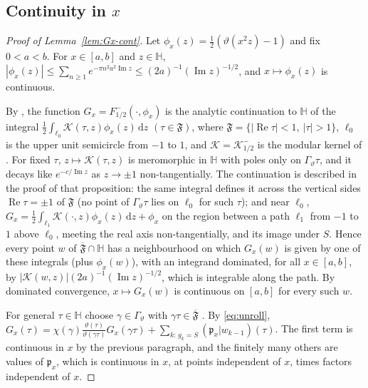 \documentclass[11pt]{amsart}
\newcommand{\dd}{\,\mathrm d}
\renewcommand{\Re}{\operatorname{Re}}
\renewcommand{\Im}{\operatorname{Im}}
\theoremstyle{definition}
\theoremstyle{remark}
\numberwithin{equation}{section}
\begin{document}
\subsection{Continuity in \texorpdfstring{$x$}{x}}\label{app:proofs-Gxcont}
\begin{proof}[Proof of Lemma~\textup{\ref{lem:Gx-cont}}]
Let $\phi_x(z)=\frac12(\vartheta(x^2z)-1)$ and fix $0<a<b$. For $x\in[a,b]$ and $z\in\mathbb H$,
$|\phi_x(z)|\le\sum_{n\ge1}e^{-\pi n^2a^2\Im z}\le(2a)^{-1}(\Im z)^{-1/2}$, and $x\mapsto\phi_x(z)$ is continuous.

By \cite[Proposition~3.3]{BRS}, the function $G_x=F^-_{1/2}(\cdot,\phi_x)$ is the analytic continuation to $\mathbb H$ of the
integral $\frac12\int_{\ell_0}\mathcal K(\tau,z)\phi_x(z)\dd z$ $(\tau\in\mathfrak F)$, where $\mathfrak F=\{|\Re\tau|<1,\ |\tau|>1\}$, $\ell_0$ is the upper unit semicircle
from $-1$ to $1$, and $\mathcal K=\mathcal K^-_{1/2}$ is the modular kernel of \cite[\S3.3]{BRS}. For fixed $\tau$, $z\mapsto\mathcal K(\tau,z)$ is
meromorphic in $\mathbb H$ with poles only on $\Gamma_\vartheta\tau$, and it decays like $e^{-c/\Im z}$ as $z\to\pm1$ non-tangentially. The continuation
is described in the proof of that proposition: the same integral defines it across the vertical sides $\Re\tau=\pm1$ of $\mathfrak F$ (no
point of $\Gamma_\vartheta\tau$ lies on $\ell_0$ for such $\tau$); and near $\ell_0$, $G_x=\frac12\int_{\ell_1}\mathcal K(\cdot,z)\phi_x(z)\dd z+\phi_x$ on the region
between a path $\ell_1$ from $-1$ to $1$ above $\ell_0$, meeting the real axis non-tangentially, and its image under $S$. Hence every
point $w$ of $\overline{\mathfrak F}\cap\mathbb H$ has a neighbourhood on which $G_x(w)$ is given by one of these integrals (plus $\phi_x(w)$), with
an integrand dominated, for all $x\in[a,b]$, by $|\mathcal K(w,z)|(2a)^{-1}(\Im z)^{-1/2}$, which is integrable along the path. By dominated
convergence, $x\mapsto G_x(w)$ is continuous on $[a,b]$ for every such $w$.

For general $\tau\in\mathbb H$ choose $\gamma\in\Gamma_\vartheta$ with $\gamma\tau\in\overline{\mathfrak F}$ \cite[\S3.1]{BRS}. By \eqref{eq:unroll},
$G_x(\tau)=\chi(\gamma)\frac{\vartheta(\tau)}{\vartheta(\gamma\tau)}G_x(\gamma\tau)+\sum_{k:\,g_k=S}(\mathfrak p_x|w_{k-1})(\tau)$. The first term is continuous in $x$ by
the previous paragraph, and the finitely many others are values of $\mathfrak p_x$, which is continuous in $x$, at points independent of $x$,
times factors independent of $x$.
\end{proof}



\end{document}
